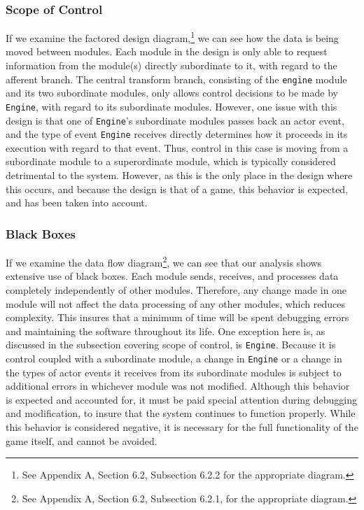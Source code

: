 \documentclass{article}
\begin{document}
		\subsubsection{Scope of Control}
			If we examine the factored design diagram,\footnote{See Appendix A, Section 6.2, Subsection 6.2.2 for the appropriate diagram.} we can see how the data is being moved between modules. Each module in the design is only able to request information from the module(s) directly subordinate to it, with regard to the afferent branch. The central transform branch, consisting of the \texttt{engine} module and its two subordinate modules, only allows control decisions to be made by \texttt{Engine}, with regard to its subordinate modules. However, one issue with this design is that one of \texttt{Engine}'s subordinate modules passes back an actor event, and the type of event \texttt{Engine} receives directly determines how it proceeds in its execution with regard to that event. Thus, control in this case is moving from a subordinate module to a superordinate module, which is typically considered detrimental to the system. However, as this is the only place in the design where this occurs, and because the design is that of a game, this behavior is expected, and has been taken into account. 
		\subsubsection{Black Boxes}
			If we examine the data flow diagram\footnote{See Appendix A, Section 6.2, Subsection 6.2.1, for the appropriate diagram.}, we can see that our analysis shows extensive use of black boxes. Each module sends, receives, and processes data completely independently of other modules. Therefore, any change made in one module will not affect the data processing of any other modules, which reduces complexity. This insures that a minimum of time will be spent debugging errors and maintaining the software throughout its life. One exception here is, as discussed in the subsection covering scope of control, is \texttt{Engine}. Because it is control coupled with a subordinate module, a change in \texttt{Engine} or a change in the types of actor events it receives from its subordinate modules is subject to additional errors in whichever module was not modified. Although this behavior is expected and accounted for, it must be paid special attention during debugging and modification, to insure that the system continues to function properly. While this behavior is considered negative, it is necessary for the full functionality of the game itself, and cannot be avoided.  
\end{document}

